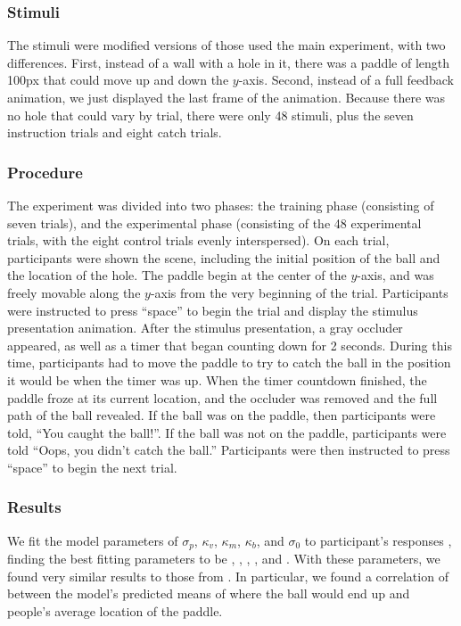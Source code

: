 \documentclass[10pt,letterpaper]{article}
\begin{document}
\subsubsection{Stimuli}

The stimuli were modified versions of those used the main experiment, with two differences.
First, instead of a wall with a hole in it, there was a paddle of length 100px that could move up and down the $y$-axis.
Second, instead of a full feedback animation, we just displayed the last frame of the animation.
Because there was no hole that could vary by trial, there were only 48 stimuli, plus the seven instruction trials and eight catch trials.

\subsubsection{Procedure}

The experiment was divided into two phases: the training phase (consisting of seven trials), and the experimental phase (consisting of the 48 experimental trials, with the eight control trials evenly interspersed).
On each trial, participants were shown the scene, including the initial position of the ball and the location of the hole.
The paddle begin at the center of the $y$-axis, and was freely movable along the $y$-axis from the very beginning of the trial.
Participants were instructed to press ``space'' to begin the trial and display the stimulus presentation animation.
After the stimulus presentation, a gray occluder appeared, as well as a timer that began counting down for 2 seconds.
During this time, participants had to move the paddle to try to catch the ball in the position it would be when the timer was up.
When the timer countdown finished, the paddle froze at its current location, and the occluder was removed and the full path of the ball revealed.
If the ball was on the paddle, then participants were told, ``You caught the ball!''.
If the ball was not on the paddle, participants were told ``Oops, you didn't catch the ball.''
Participants were then instructed to press ``space'' to begin the next trial.

\subsubsection{Results}

We fit the model parameters of $\sigma_p$, $\kappa_v$, $\kappa_m$, $\kappa_b$, and $\sigma_0$ to participant's responses \cite<for details, see>{Smith:2013fc}, finding the best fitting parameters to be \perr{}, \kapv{}, \kapm{}, \kapb{}, and \sdzero{}. 
With these parameters, we found very similar results to those from .
In particular, we found a correlation of \PaddleCorr{} between the model's predicted means of where the ball would end up and people's average location of the paddle.



\setlength{\bibleftmargin}{.125in}
\setlength{\bibindent}{-\bibleftmargin}


\end{document}

